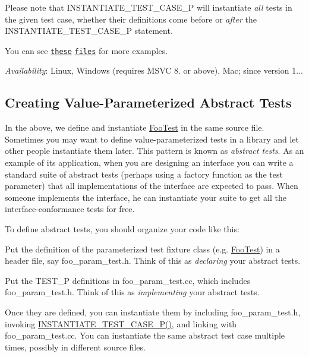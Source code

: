 Please note that {\ttfamily I\+N\+S\+T\+A\+N\+T\+I\+A\+T\+E\+\_\+\+T\+E\+S\+T\+\_\+\+C\+A\+S\+E\+\_\+P} will instantiate {\itshape all} tests in the given test case, whether their definitions come before or {\itshape after} the {\ttfamily I\+N\+S\+T\+A\+N\+T\+I\+A\+T\+E\+\_\+\+T\+E\+S\+T\+\_\+\+C\+A\+S\+E\+\_\+P} statement.

You can see \href{../samples/sample7_unittest.cc}{\tt these} \href{../samples/sample8_unittest.cc}{\tt files} for more examples.

{\itshape Availability}\+: Linux, Windows (requires M\+S\+VC 8. or above), Mac; since version 1...

\subsection*{Creating Value-\/\+Parameterized Abstract Tests}

In the above, we define and instantiate {\ttfamily \hyperlink{class_foo_test}{Foo\+Test}} in the same source file. Sometimes you may want to define value-\/parameterized tests in a library and let other people instantiate them later. This pattern is known as {\itshape abstract tests}. As an example of its application, when you are designing an interface you can write a standard suite of abstract tests (perhaps using a factory function as the test parameter) that all implementations of the interface are expected to pass. When someone implements the interface, he can instantiate your suite to get all the interface-\/conformance tests for free.

To define abstract tests, you should organize your code like this\+:


\begin{DoxyEnumerate}
\item Put the definition of the parameterized test fixture class (e.\+g. {\ttfamily \hyperlink{class_foo_test}{Foo\+Test}}) in a header file, say {\ttfamily foo\+\_\+param\+\_\+test.\+h}. Think of this as {\itshape declaring} your abstract tests.
\end{DoxyEnumerate}
\begin{DoxyEnumerate}
\item Put the {\ttfamily T\+E\+S\+T\+\_\+P} definitions in {\ttfamily foo\+\_\+param\+\_\+test.\+cc}, which includes {\ttfamily foo\+\_\+param\+\_\+test.\+h}. Think of this as {\itshape implementing} your abstract tests.
\end{DoxyEnumerate}

Once they are defined, you can instantiate them by including {\ttfamily foo\+\_\+param\+\_\+test.\+h}, invoking {\ttfamily \hyperlink{namespacetesting_1_1gmock__matchers__test_a16ff96ce4f97da6215f889baccd57e87}{I\+N\+S\+T\+A\+N\+T\+I\+A\+T\+E\+\_\+\+T\+E\+S\+T\+\_\+\+C\+A\+S\+E\+\_\+\+P()}}, and linking with {\ttfamily foo\+\_\+param\+\_\+test.\+cc}. You can instantiate the same abstract test case multiple times, possibly in different source files.

